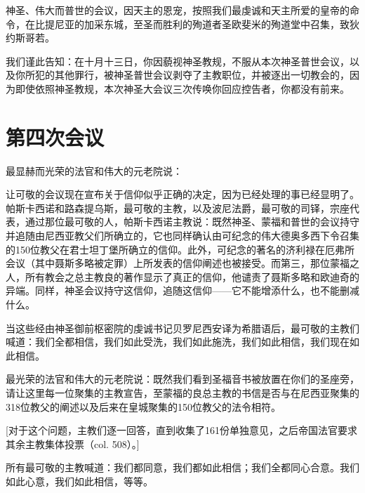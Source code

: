 神圣、伟大而普世的会议，因天主的恩宠，按照我们最虔诚和天主所爱的皇帝的命令，在比提尼亚的加采东城，至圣而胜利的殉道者圣欧斐米的殉道堂中召集，致狄约斯哥若。\par

我们谨此告知：在十月十三日，你因藐视神圣教规，不服从本次神圣普世会议，以及你所犯的其他罪行，被神圣普世会议剥夺了主教职位，并被逐出一切教会的，因为即使依照神圣教规，本次神圣大会议三次传唤你回应控告者，你都没有前来。\par


\section{第四次会议}

最显赫而光荣的法官和伟大的元老院说：\par

让可敬的会议现在宣布关于信仰似乎正确的决定，因为已经处理的事已经显明了。帕斯卡西诺和路森提乌斯，最可敬的主教，以及波尼法爵，最可敬的司铎，宗座代表，通过那位最可敬的人，帕斯卡西诺主教说：既然神圣、蒙福和普世的会议持守并追随由尼西亚教父们所确立的，它也同样确认由可纪念的伟大德奥多西下令召集的150位教父在君士坦丁堡所确立的信仰。此外，可纪念的著名的济利禄在厄弗所会议（其中聂斯多略被定罪）上所发表的信仰阐述也被接受。而第三，那位蒙福之人，所有教会之总主教良的著作显示了真正的信仰，他谴责了聂斯多略和欧迪奇的异端。同样，神圣会议持守这信仰，追随这信仰——它不能增添什么，也不能删减什么。\par

当这些经由神圣御前枢密院的虔诚书记贝罗尼西安译为希腊语后，最可敬的主教们喊道：我们全都相信，我们如此受洗，我们如此施洗，我们如此相信，我们现在如此相信。\par

最光荣的法官和伟大的元老院说：既然我们看到圣福音书被放置在你们的圣座旁，请让这里每一位聚集的主教宣告，至蒙福的良总主教的书信是否与在尼西亚聚集的318位教父的阐述以及后来在皇城聚集的150位教父的法令相符。\par

[对于这个问题，主教们逐一回答，直到收集了161份单独意见，之后帝国法官要求其余主教集体投票（col. 508）。]\par

所有最可敬的主教喊道：我们都同意，我们都如此相信；我们全都同心合意。我们如此心意，我们如此相信，等等。\par

